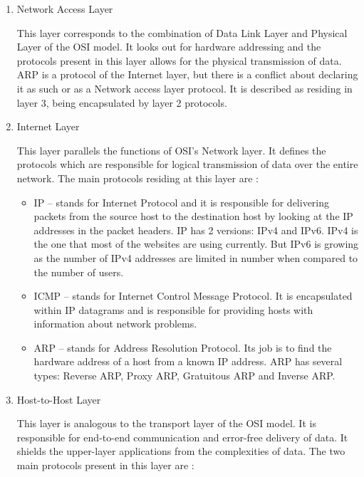 \documentclass[a4paper,twoside, 12pt]{report}
\theoremstyle{break}
\begin{document}
\begin{enumerate}

  \item Network Access Layer

        This layer corresponds to the combination of Data Link Layer and Physical Layer of the OSI model. It looks out for hardware addressing and the protocols present in this layer allows for the physical transmission of data.
        ARP is a protocol of the Internet layer, but there is a conflict about declaring it as such or as a Network access layer protocol. It is described as residing in layer 3, being encapsulated by layer 2 protocols.


  \item Internet Layer

        This layer parallels the functions of OSI’s Network layer. It defines the protocols which are responsible for logical transmission of data over the entire network. The main protocols residing at this layer are :
        \begin{itemize}

          \item IP – stands for Internet Protocol and it is responsible for delivering packets from the source host to the destination host by looking at the IP addresses in the packet headers. IP has 2 versions:
                IPv4 and IPv6. IPv4 is the one that most of the websites are using currently. But IPv6 is growing as the number of IPv4 addresses are limited in number when compared to the number of users.
          \item ICMP – stands for Internet Control Message Protocol. It is encapsulated within IP datagrams and is responsible for providing hosts with information about network problems.
          \item ARP – stands for Address Resolution Protocol. Its job is to find the hardware address of a host from a known IP address. ARP has several types: Reverse ARP, Proxy ARP, Gratuitous ARP and Inverse ARP.
        \end{itemize}

  \item Host-to-Host Layer

        This layer is analogous to the transport layer of the OSI model. It is responsible for end-to-end communication and error-free delivery of data. It shields the upper-layer applications from the complexities of data. The two main protocols present in this layer are :
        \begin{itemize}


\end{itemize}
\end{enumerate}
\end{document}
